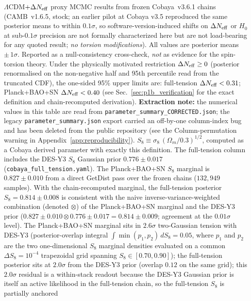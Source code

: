 \documentclass[aps,prd,twocolumn,superscriptaddress,showpacs,preprintnumbers,nofootinbib,longbibliography,floatfix]{revtex4-2}
\newcommand{\Neff}{N_{\rm eff}}
\begin{document}
\begin{table}[t]
\caption{\label{tab:verification} $\Lambda$CDM$+\Delta\Neff$ proxy MCMC results
from frozen Cobaya~v3.6.1 chains (CAMB~v1.6.5, stock; an earlier pilot at
Cobaya v3.5 reproduced the same posterior means to within $0.1\sigma$, so
software-version-induced shifts on $\Delta\Neff$ or $H_0$ at sub-$0.1\sigma$
precision are not formally characterized here but are not load-bearing for
any quoted result; \emph{no torsion
modifications}). All values are posterior means $\pm\,1\sigma$. Reported as a
null-consistency cross-check, \emph{not} as evidence for the spin-torsion theory.
Under the physically motivated restriction $\Delta\Neff\ge 0$ (posterior renormalised
on the non-negative half and 95th percentile read from the truncated CDF), the one-sided
95\% upper limits are: full-tension $\Delta\Neff < 0.31$; Planck+BAO+SN $\Delta\Neff < 0.40$
(see Sec.~\ref{sec:p1b_verification} for the exact definition and chain-recomputed derivation).
\textbf{Extraction note:} the numerical values in this table are read from
\texttt{parameter\_summary\_CORRECTED.json}; the legacy
\texttt{parameter\_summary.json} export carried an off-by-one column-index
bug and has been deleted from the public repository (see the
Column-permutation warning in Appendix~\ref{app:reproducibility}).
$S_8 \equiv \sigma_8\,(\Omega_m/0.3)^{1/2}$, computed as a Cobaya derived
parameter with exactly this definition. The full-tension column includes
the DES-Y3 $S_8$ Gaussian prior $0.776 \pm 0.017$
(\texttt{cobaya\_full\_tension.yaml}).
The Planck+BAO+SN $S_8$ marginal is $0.827\pm 0.010$ from a direct GetDist
pass over the frozen chains ($132{,}949$ samples). With the
chain-recomputed marginal, the full-tension posterior
$S_8 = 0.814\pm 0.008$ is consistent with the naive inverse-variance-weighted
combination (denoted $\otimes$) of the Planck+BAO+SN marginal and the DES-Y3 prior
($0.827\pm 0.010 \otimes 0.776\pm 0.017 = 0.814\pm 0.009$; agreement at
the $0.01\sigma$ level). The Planck+BAO+SN marginal sits in $2.6\sigma$
two-Gaussian tension with DES-Y3 (posterior-overlap integral
$\int\!\min(p_1,p_2)\,dS_8 = 0.05$, where $p_1$ and $p_2$ are the two
one-dimensional $S_8$ marginal densities evaluated on a common
$\Delta S_8 = 10^{-4}$ trapezoidal grid spanning
$S_8 \in [0.70, 0.90]$); the full-tension posterior sits at
$2.0\sigma$ from the DES-Y3 prior (overlap $0.12$ on the same grid);
this $2.0\sigma$ residual is a within-stack readout because the
DES-Y3 Gaussian prior is itself an active likelihood in the
full-tension chain, so the full-tension $S_8$ is partially anchored
}
\end{table}
\end{document}
